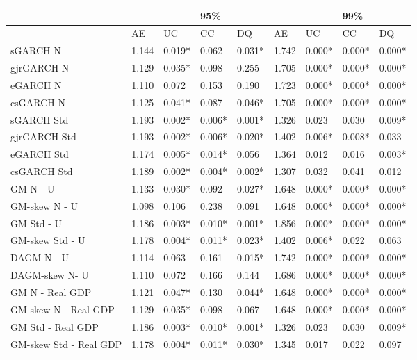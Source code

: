\documentclass{article}
\begin{document}


\begin{table}[ht] 
\centering
\begin{tabular}{|l|llll|llll|}
 \hline
  &  &  & 95\% &  &   &  & 99\%&\\
\hline
 & AE & UC & CC & DQ & AE & UC & CC & DQ\\ 
  \hline
sGARCH N & 1.144 & 0.019* & 0.062 & 0.031* & 1.742 & 0.000* & 0.000* & 0.000*\\ 
  gjrGARCH N & 1.129 & 0.035* & 0.098 & 0.255 & 1.705 & 0.000*& 0.000* & 0.000*\\ 
  eGARCH N & 1.110 & 0.072 & 0.153 & 0.190 & 1.723 & 0.000* & 0.000* & 0.000*\\ 
  csGARCH N & 1.125 & 0.041* & 0.087 & 0.046* & 1.705 & 0.000* & 0.000* & 0.000* \\ 
  sGARCH Std & 1.193 & 0.002* & 0.006* & 0.001* & 1.326 & 0.023 & 0.030 & 0.009*\\ 
  gjrGARCH Std & 1.193 & 0.002* & 0.006* & 0.020* & 1.402 & 0.006* & 0.008* & 0.033\\ 
  eGARCH Std & 1.174 & 0.005* & 0.014* & 0.056 & 1.364 & 0.012 & 0.016 & 0.003*\\ 
  csGARCH Std & 1.189 & 0.002* & 0.004* & 0.002* & 1.307 & 0.032 & 0.041 & 0.012\\ 
  GM N - U & 1.133 & 0.030* & 0.092 & 0.027* & 1.648 & 0.000* & 0.000* & 0.000*\\ 
  GM-skew N - U & 1.098 & 0.106 & 0.238 & 0.091 & 1.648 & 0.000* & 0.000* & 0.000* \\ 
  GM Std - U & 1.186 & 0.003* & 0.010* & 0.001* & 1.856 & 0.000* & 0.000* & 0.000* \\ 
  GM-skew Std - U & 1.178 & 0.004* & 0.011* & 0.023* & 1.402 & 0.006* & 0.022 & 0.063 \\ 
  DAGM N - U & 1.114 & 0.063 & 0.161 & 0.015* & 1.742 & 0.000* & 0.000* & 0.000*\\ 
  DAGM-skew  N- U & 1.110 & 0.072 & 0.166 & 0.144 & 1.686 & 0.000* & 0.000* & 0.000*\\ 
  GM N - Real GDP & 1.121 & 0.047* & 0.130 & 0.044* &  1.648 & 0.000* & 0.000* & 0.000*\\ 
  GM-skew N - Real GDP & 1.129 & 0.035* & 0.098 & 0.067 &  1.648 & 0.000* & 0.000* & 0.000*\\ 
  GM Std - Real GDP & 1.186 & 0.003* & 0.010* & 0.001* & 1.326 & 0.023 & 0.030 & 0.009* \\ 
  GM-skew Std - Real GDP & 1.178 & 0.004* & 0.011* & 0.030* & 1.345 & 0.017 & 0.022 & 0.097\\ 

\end{tabular}
\end{table}
\end{document}
